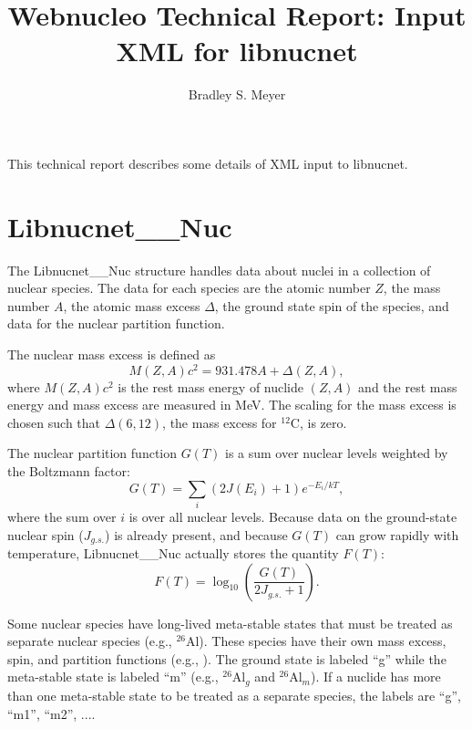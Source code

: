 \documentclass{article}    %
\title{Webnucleo Technical Report: Input XML for libnucnet}  %
\author{Bradley S. Meyer}
\begin{document}

\maketitle                 %


This technical report describes some details of XML input to
libnucnet.

\section{Libnucnet\_\_Nuc}  \label{sec:nuc}

The Libnucnet\_\_Nuc structure handles data about nuclei in a
collection of nuclear species.  The data for each species are the
atomic number $Z$, the mass number $A$, the atomic mass excess
$\Delta$, the ground state spin of the species, and data for the
nuclear partition function.

The nuclear mass excess is defined as
\begin{equation}
M(Z,A)c^2 = 931.478 A + \Delta(Z,A),\label{eq:mass}
\end{equation}
where $M(Z,A)c^2$ is the rest mass energy of nuclide $(Z,A)$ and the
rest mass energy and mass excess are measured in MeV.  The scaling
for the mass excess is chosen such that $\Delta(6,12)$, the mass
excess for $^{12}$C, is zero.

The nuclear partition function $G(T)$ is a sum over nuclear levels
weighted by the Boltzmann factor:
\begin{equation}
G(T) = \sum_i \left( 2 J(E_i) + 1 \right ) e^{-E_i/kT}, \label{eq:G}
\end{equation}
where the sum over $i$ is over all nuclear levels.  Because data on
the ground-state nuclear spin ($J_{g.s.}$) is already present, and
because $G(T)$ can grow rapidly with temperature, Libnucnet\_\_Nuc
actually stores the quantity $F(T)$:
\begin{equation}
F(T) = \log_{10}\left(\frac{G(T)}{2J_{g.s.} + 1}\right).
\label{eq:F}
\end{equation}

Some nuclear species have long-lived meta-stable states that must be
treated as separate nuclear species (e.g., $^{26}$Al).  These
species have their own mass excess, spin, and partition functions
(e.g., \cite{2001PhRvC..64b5805G}).
The ground state is labeled ``g'' while the
meta-stable state is labeled ``m'' (e.g., $^{26}$Al$_g$ and
$^{26}$Al$_m$).  If a nuclide has more than one meta-stable state to
be treated as a separate species, the labels are ``g'', ``m1'',
``m2'', ....
\end{document}
